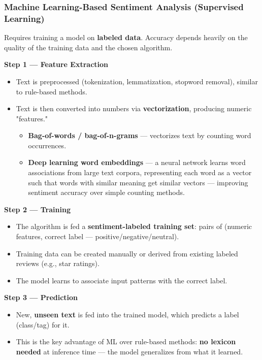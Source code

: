 \documentclass[12pt,openany]{book}
\begin{document}
\subsubsection{Machine Learning-Based Sentiment Analysis (Supervised Learning)}

Requires training a model on \textbf{labeled data}. Accuracy depends heavily on the quality of the training data and the chosen algorithm.

\textbf{Step 1 --- Feature Extraction}
\begin{itemize}[leftmargin=*]
    \item Text is preprocessed (tokenization, lemmatization, stopword removal), similar to rule-based methods.
    \item Text is then converted into numbers via \textbf{vectorization}, producing numeric "features."
    \begin{itemize}[leftmargin=*]
        \item \textbf{Bag-of-words / bag-of-n-grams} --- vectorizes text by counting word occurrences.
        \item \textbf{Deep learning word embeddings} --- a neural network learns word associations from large text corpora, representing each word as a vector such that words with similar meaning get similar vectors --- improving sentiment accuracy over simple counting methods.
    \end{itemize}
\end{itemize}

\textbf{Step 2 --- Training}
\begin{itemize}[leftmargin=*]
    \item The algorithm is fed a \textbf{sentiment-labeled training set}: pairs of (numeric features, correct label --- positive/negative/neutral).
    \item Training data can be created manually or derived from existing labeled reviews (e.g., star ratings).
    \item The model learns to associate input patterns with the correct label.
\end{itemize}

\textbf{Step 3 --- Prediction}
\begin{itemize}[leftmargin=*]
    \item New, \textbf{unseen text} is fed into the trained model, which predicts a label (class/tag) for it.
    \item This is the key advantage of ML over rule-based methods: \textbf{no lexicon needed} at inference time --- the model generalizes from what it learned.
\end{itemize}
\end{document}

